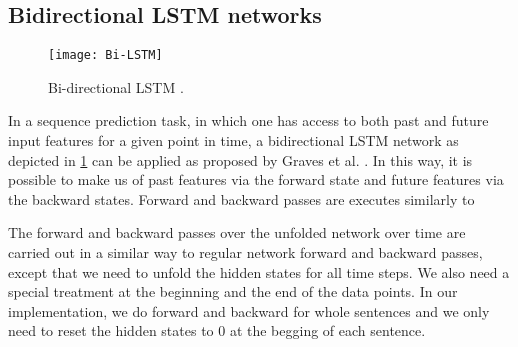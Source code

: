\begin{comment}
\begin{equation} \label{eq:f_t}
	f_t = \sigma(W_f \cdot [h_{t-1},x_t] + b_f)
\end{equation}

\begin{equation} \label{eq:i_t}
i_t = \sigma(W_i \cdot [h_{t-1},x_t] + b_i)
\end{equation}

\begin{equation} \label{eq:hatC_t}
\hat{C}_t = \tanh(W_C \cdot [h_{t-1},x_t] + b_C)
\end{equation}

\begin{equation} \label{eq:C_t}
C_t = f_t \cdot C_{t-1} + i_t \cdot \hat{C}_t
\end{equation}

\begin{equation} \label{eq:o_t}
o_t = \sigma (W_o [h_{t-1}, x_t] + b_o)
\end{equation}

\begin{equation} \label{eq:h_t}
h_t = o_t \cdot \tanh(C_t)
\end{equation}
\end{comment}


\subsection{Bidirectional LSTM networks \label{sec:bi-lstm}}
\begin{figure}[h]
  \centering
  \texttt{[image: Bi-LSTM]} \\
  \caption{Bi-directional LSTM \cite{graves2013speech}.}
  \label{fig:bi-lstm}
\end{figure}
In a sequence prediction task, in which one has access to both past and future input features for a given point in time, a bidirectional LSTM network as depicted in \ref{fig:bi-lstm} can be applied as proposed by Graves et al. \cite{graves2013speech}. In this way, it is possible to make us of past features via the forward state and future features via the backward states. Forward and backward passes are executes similarly to 



The forward and backward passes over the unfolded network over time are carried out in a similar way to regular network forward and backward passes, except that we need to unfold the hidden states for all time steps. We also need a special treatment at the beginning and the end of the data points. In our implementation, we do forward and backward for whole sentences and we only need to reset the hidden states to 0 at the begging of each sentence. 




